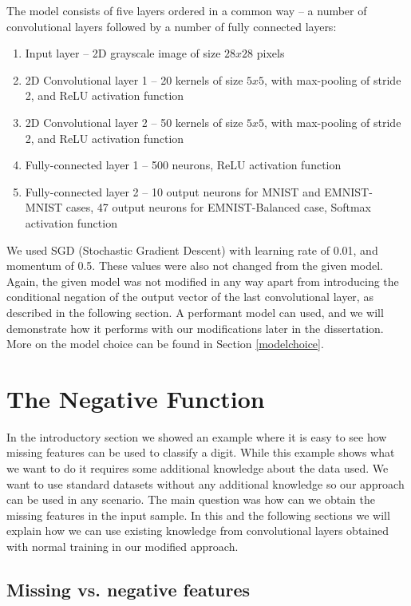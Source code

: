 \documentclass[b5paper]{book}
\begin{document}
The model consists of five layers ordered in a common way -- a number of convolutional layers followed by a number of fully connected layers:

\begin{enumerate}
  \item Input layer -- 2D grayscale image of size \(28x28\) pixels
  \item 2D Convolutional layer 1 -- 20 kernels of size \(5x5\), with max-pooling of stride 2, and ReLU activation function 
  \item 2D Convolutional layer 2 -- 50 kernels of size \(5x5\), with max-pooling of stride 2, and ReLU activation function
  \item Fully-connected layer 1 -- 500 neurons, ReLU activation function
  \item Fully-connected layer 2 -- 10 output neurons for MNIST and EMNIST-MNIST cases, 47 output neurons for EMNIST-Balanced case, Softmax activation function
\end{enumerate}

We used SGD (Stochastic Gradient Descent) with learning rate of 0.01, and momentum of 0.5. These values were also not changed from the given model. Again, the given model was not modified in any way apart from introducing the conditional negation of the output vector of the last convolutional layer, as described in the following section. A performant model can used, and we will demonstrate how it performs with our modifications later in the dissertation. More on the model choice can be found in Section \ref{modelchoice}.


\section{The Negative Function}

In the introductory section we showed an example where it is easy to see how missing features can be used to classify a digit. While this example shows what we want to do it requires some additional knowledge about the data used. We want to use standard datasets without any additional knowledge so our approach can be used in any scenario. The main question was how can we obtain the missing features in the input sample. In this and the following sections we will explain how we can use existing knowledge from convolutional layers obtained with normal training in our modified approach. 

\subsection{Missing vs. negative features}
\end{document}

